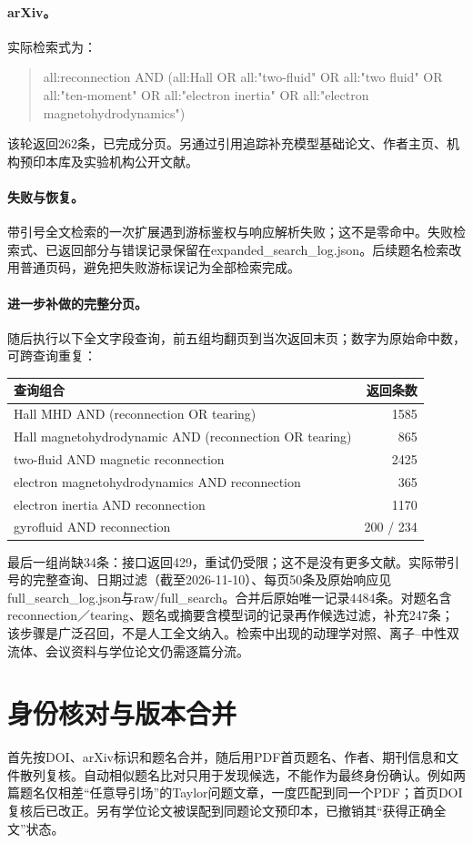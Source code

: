 \documentclass[UTF8,a4paper,11pt,openany,fontset=fandol]{ctexbook}
\begin{document}
\paragraph{arXiv。}实际检索式为：
\begin{quote}\small
all:reconnection AND (all:Hall OR all:"two-fluid" OR all:"two fluid" OR all:"ten-moment" OR all:"electron inertia" OR all:"electron magnetohydrodynamics")
\end{quote}
该轮返回262条，已完成分页。另通过引用追踪补充模型基础论文、作者主页、机构预印本库及实验机构公开文献。

\paragraph{失败与恢复。}带引号全文检索的一次扩展遇到游标鉴权与响应解析失败；这不是零命中。失败检索式、已返回部分与错误记录保留在expanded\_search\_log.json。后续题名检索改用普通页码，避免把失败游标误记为全部检索完成。

\paragraph{进一步补做的完整分页。}随后执行以下全文字段查询，前五组均翻页到当次返回末页；数字为原始命中数，可跨查询重复：
\begin{center}\small
\begin{tabular}{lr}\toprule 查询组合 & 返回条数\\\midrule
Hall MHD AND (reconnection OR tearing)&1585\\
Hall magnetohydrodynamic AND (reconnection OR tearing)&865\\
two-fluid AND magnetic reconnection&2425\\
electron magnetohydrodynamics AND reconnection&365\\
electron inertia AND reconnection&1170\\
gyrofluid AND reconnection&200 / 234\\\bottomrule
\end{tabular}\end{center}
最后一组尚缺34条：接口返回429，重试仍受限；这不是没有更多文献。实际带引号的完整查询、日期过滤（截至2026-11-10）、每页50条及原始响应见full\_search\_log.json与raw/full\_search。合并后原始唯一记录4484条。对题名含reconnection／tearing、题名或摘要含模型词的记录再作候选过滤，补充247条；该步骤是广泛召回，不是人工全文纳入。检索中出现的动理学对照、离子--中性双流体、会议资料与学位论文仍需逐篇分流。

\section{身份核对与版本合并}
首先按DOI、arXiv标识和题名合并，随后用PDF首页题名、作者、期刊信息和文件散列复核。自动相似题名比对只用于发现候选，不能作为最终身份确认。例如两篇题名仅相差“任意导引场”的Taylor问题文章，一度匹配到同一个PDF；首页DOI复核后已改正。另有学位论文被误配到同题论文预印本，已撤销其“获得正确全文”状态。
\end{document}
